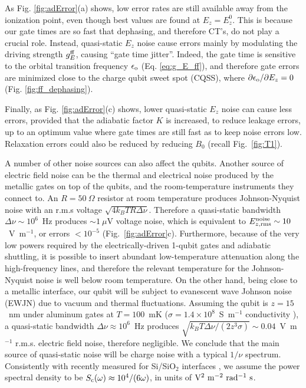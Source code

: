 As Fig. \ref{fig:adError}(a) shows, low error rates are still available away from the ionization point, even though best values are found at $E_z=E_z^0$. This is because our gate times are so fast that dephasing, and therefore CT's, do not play a crucial role. Instead, quasi-static $E_z$ noise cause errors mainly by modulating the driving strength $g_E^{\rm ff}$, causing ``gate time jitter''. Indeed, the gate time is sensitive to the orbital transition frequency $\epsilon_{\rm o}$ (Eq. \ref{eq:g_E_ff}), and therefore gate errors are minimized close to the charge qubit sweet spot (CQSS), where $\partial\epsilon_{\rm o}/\partial E_z=0$ (Fig. \ref{fig:ff_dephasing}).

Finally, as Fig. \ref{fig:adError}(c) shows, lower quasi-static $E_z$ noise can cause less errors, provided that the adiabatic factor $K$ is increased, to reduce leakage errors, up to an optimum value where gate times are still fast as to keep noise errors low. Relaxation errors could also be reduced by reducing $B_0$ (recall Fig.~\ref{fig:T1}).

A number of other noise sources can also affect the qubits. Another source of electric field noise can be the thermal and electrical noise produced by the metallic gates on top of the qubits, and the room-temperature instruments they connect to. An $R=50~\Omega$ resistor at room temperature produces Johnson-Nyquist noise with an r.m.s voltage $\sqrt{4k_BTR\Delta\nu}$. Therefore a quasi-static bandwidth $\Delta\nu\sim10^6$~Hz produces $\sim1~\mu$V voltage noise, which is equivalent to $E_{z,\rm rms}^{\rm noise}\sim10$~V~m$^{-1}$, or errors $<10^{-5}$ (Fig.~\ref{fig:adError}c). Furthermore, because of the very low powers required by the electrically-driven 1-qubit gates and adiabatic shuttling, it is possible to insert abundant low-temperature attenuation along the high-frequency lines, and therefore the relevant temperature for the Johnson-Nyquist noise is well below room temperature. On the other hand, being close to a metallic interface, our qubit will be subject to evanescent wave Johnson noise (EWJN) due to vacuum and thermal fluctuations. Assuming the qubit is $z=15$~nm under aluminum gates at $T=100$~mK ($\sigma=1.4\times10^8$~S~m$^{-1}$ conductivity \cite{Dehollain2013S}), a quasi-static bandwidth $\Delta\nu\approx10^6$~Hz produces \cite{Henkel1999S} $\sqrt{k_BT\Delta\nu/(2z^3\sigma)}\sim0.04$~V~m$^{-1}$ r.m.s. electric field noise, therefore negligible. We conclude that the main source of quasi-static noise will be charge noise with a typical $1/\nu$ spectrum. Consistently with recently measured for Si/SiO$_2$ interfaces \cite{Freeman2016S}, we assume the power spectral density to be $S_{\rm c}(\omega)\approx10^4/(6\omega)$, in units of ${\rm V^2~m^{-2}~rad^{-1}~s}$.

